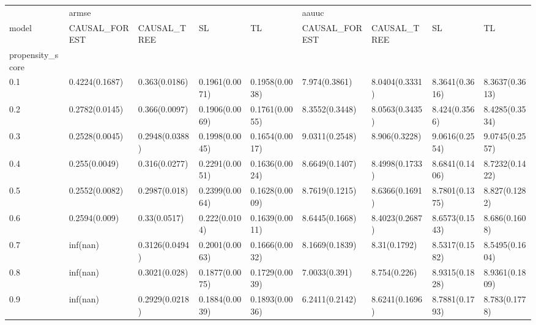 \begin{tabular}{lllllllll}
\toprule
{} & \multicolumn{4}{l}{armse} & \multicolumn{4}{l}{aauuc} \\
model &   CAUSAL\_FOREST &     CAUSAL\_TREE &              SL &              TL &   CAUSAL\_FOREST &     CAUSAL\_TREE &              SL &              TL \\
propensity\_score &                 &                 &                 &                 &                 &                 &                 &                 \\
\midrule
0.1              &  0.4224(0.1687) &   0.363(0.0186) &  0.1961(0.0071) &  0.1958(0.0038) &   7.974(0.3861) &  8.0404(0.3331) &  8.3641(0.3616) &  8.3637(0.3613) \\
0.2              &  0.2782(0.0145) &   0.366(0.0097) &  0.1906(0.0069) &  0.1761(0.0055) &  8.3552(0.3448) &  8.0563(0.3435) &   8.424(0.3566) &  8.4285(0.3534) \\
0.3              &  0.2528(0.0045) &  0.2948(0.0388) &  0.1998(0.0045) &  0.1654(0.0017) &  9.0311(0.2548) &   8.906(0.3228) &  9.0616(0.2554) &  9.0745(0.2557) \\
0.4              &   0.255(0.0049) &   0.316(0.0277) &  0.2291(0.0051) &  0.1636(0.0024) &  8.6649(0.1407) &  8.4998(0.1733) &  8.6841(0.1406) &  8.7232(0.1422) \\
0.5              &  0.2552(0.0082) &   0.2987(0.018) &  0.2399(0.0064) &  0.1628(0.0009) &  8.7619(0.1215) &  8.6366(0.1691) &  8.7801(0.1375) &   8.827(0.1282) \\
0.6              &   0.2594(0.009) &    0.33(0.0517) &   0.222(0.0104) &  0.1639(0.0011) &  8.6445(0.1668) &  8.4023(0.2687) &  8.6573(0.1543) &   8.686(0.1608) \\
0.7              &        inf(nan) &  0.3126(0.0494) &  0.2001(0.0063) &  0.1666(0.0032) &  8.1669(0.1839) &    8.31(0.1792) &  8.5317(0.1582) &  8.5495(0.1604) \\
0.8              &        inf(nan) &   0.3021(0.028) &  0.1877(0.0075) &  0.1729(0.0039) &   7.0033(0.391) &    8.754(0.226) &  8.9315(0.1828) &  8.9361(0.1809) \\
0.9              &        inf(nan) &  0.2929(0.0218) &  0.1884(0.0039) &  0.1893(0.0036) &  6.2411(0.2142) &  8.6241(0.1696) &  8.7881(0.1793) &   8.783(0.1778) \\
\bottomrule
\end{tabular}
